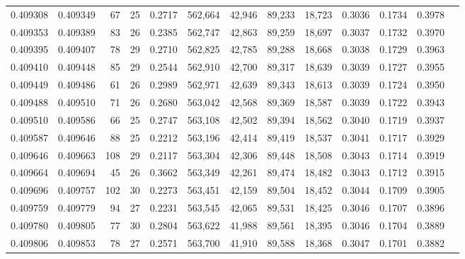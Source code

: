 \begin{tabular}{rrrrrrrrrrrrr}
0.409308 & 0.409349 &    67 &  25 &                                     0.2717 & 562,664 &  42,946 &  89,233 &  18,723 & 0.3036 & 0.1734 & 0.3978 \\
0.409353 & 0.409389 &    83 &  26 &                                     0.2385 & 562,747 &  42,863 &  89,259 &  18,697 & 0.3037 & 0.1732 & 0.3970 \\
0.409395 & 0.409407 &    78 &  29 &                                     0.2710 & 562,825 &  42,785 &  89,288 &  18,668 & 0.3038 & 0.1729 & 0.3963 \\
0.409410 & 0.409448 &    85 &  29 &                                     0.2544 & 562,910 &  42,700 &  89,317 &  18,639 & 0.3039 & 0.1727 & 0.3955 \\
0.409449 & 0.409486 &    61 &  26 &                                     0.2989 & 562,971 &  42,639 &  89,343 &  18,613 & 0.3039 & 0.1724 & 0.3950 \\
0.409488 & 0.409510 &    71 &  26 &                                     0.2680 & 563,042 &  42,568 &  89,369 &  18,587 & 0.3039 & 0.1722 & 0.3943 \\
0.409510 & 0.409586 &    66 &  25 &                                     0.2747 & 563,108 &  42,502 &  89,394 &  18,562 & 0.3040 & 0.1719 & 0.3937 \\
0.409587 & 0.409646 &    88 &  25 &                                     0.2212 & 563,196 &  42,414 &  89,419 &  18,537 & 0.3041 & 0.1717 & 0.3929 \\
0.409646 & 0.409663 &   108 &  29 &                                     0.2117 & 563,304 &  42,306 &  89,448 &  18,508 & 0.3043 & 0.1714 & 0.3919 \\
0.409664 & 0.409694 &    45 &  26 &                                     0.3662 & 563,349 &  42,261 &  89,474 &  18,482 & 0.3043 & 0.1712 & 0.3915 \\
0.409696 & 0.409757 &   102 &  30 &                                     0.2273 & 563,451 &  42,159 &  89,504 &  18,452 & 0.3044 & 0.1709 & 0.3905 \\
0.409759 & 0.409779 &    94 &  27 &                                     0.2231 & 563,545 &  42,065 &  89,531 &  18,425 & 0.3046 & 0.1707 & 0.3896 \\
0.409780 & 0.409805 &    77 &  30 &                                     0.2804 & 563,622 &  41,988 &  89,561 &  18,395 & 0.3046 & 0.1704 & 0.3889 \\
0.409806 & 0.409853 &    78 &  27 &                                     0.2571 & 563,700 &  41,910 &  89,588 &  18,368 & 0.3047 & 0.1701 & 0.3882 \\

\end{tabular}
